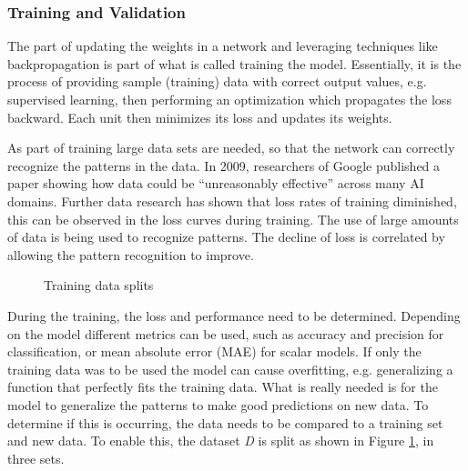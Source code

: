 \documentclass[11pt]{article}
\begin{document}
\subsubsection{Training and Validation} \label{sec:training}
The part of updating the weights in a network and leveraging techniques like backpropagation is part of what is called training the model. Essentially, it is the process of providing sample (training) data with correct output values, e.g. supervised learning, then performing an optimization which propagates the loss backward. Each unit then minimizes its loss and updates its weights.

As part of training large data sets are needed, so that the network can correctly recognize the patterns in the data. In 2009, researchers \citet{Halevy2009TheData} of Google published a paper showing how data could be ``unreasonably effective'' across many AI domains. Further data research has shown that loss rates of training diminished, this can be observed in the loss curves during training. The use of large amounts of data is being used to recognize patterns. The decline of loss is correlated by allowing the pattern recognition to improve.

\begin{figure}[!ht]
	\centering
	\caption{Training data splits}
	\label{fig:train-validation-test}
\end{figure}

During the training, the loss and performance need to be determined. Depending on the model different metrics can be used, such as accuracy and precision for classification, or mean absolute error (MAE) for scalar models. If only the training data was to be used the model can cause overfitting, e.g. generalizing a function that perfectly fits the training data. What is really needed is for the model to generalize the patterns to make good predictions on new data. To determine if this is occurring, the data needs to be compared to a training set and new data. To enable this, the dataset \textit{D} is split as shown in Figure \ref{fig:train-validation-test}, in three sets.
\end{document}
